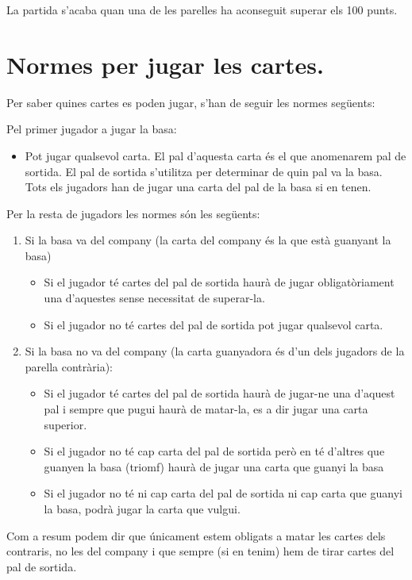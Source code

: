 La partida s'acaba quan una de les parelles ha aconseguit superar els 100 punts.

\section{Normes per jugar les cartes.}

Per saber quines cartes es poden jugar, s'han de seguir les normes següents:

Pel primer jugador a jugar la basa:

\begin{itemize}
    \item{Pot jugar qualsevol carta. El pal d'aquesta carta és el que anomenarem pal de sortida. El pal de sortida s'utilitza per determinar de quin pal va la basa. Tots els jugadors han de jugar una carta del pal de la basa si en tenen.  }
\end{itemize}

Per la resta de jugadors les normes són les següents:
\begin{enumerate}
\item{Si la basa va del company (la carta del company és la que està guanyant la basa)
    \begin{itemize}
        \item{Si el jugador té cartes del pal de sortida haurà de jugar obligatòriament una d'aquestes sense necessitat de superar-la.}
        \item{Si el jugador no té cartes del pal de sortida pot jugar qualsevol carta.}
     \end{itemize}
}   
\item{Si la basa no va del company (la carta guanyadora és d'un dels jugadors de la parella contrària):
    \begin{itemize}
        \item{Si el jugador té cartes del pal de sortida haurà de jugar-ne una d'aquest pal i sempre que pugui haurà de matar-la, es a dir jugar una carta superior.}
        \item{Si el jugador no té cap carta del pal de sortida però en té d'altres que guanyen la basa (triomf) haurà de jugar una carta que guanyi la basa}
        \item{Si el jugador no té ni cap carta del pal de sortida ni cap carta que guanyi la basa, podrà jugar la carta que vulgui.}
    \end{itemize}
}
\end{enumerate}
Com a resum podem dir que únicament estem obligats a matar les cartes dels contraris, no les del company i que sempre (si en tenim) hem de tirar cartes del pal de sortida.

